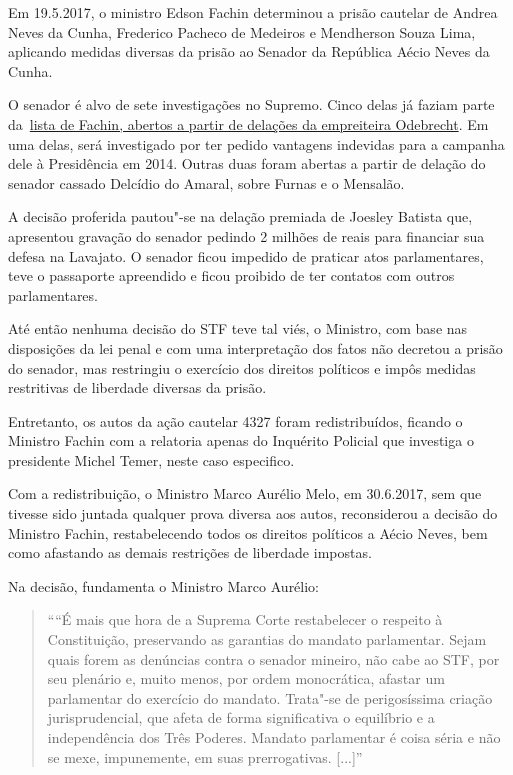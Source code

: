 {Em 19.5.2017, o ministro Edson Fachin determinou a prisão cautelar de
Andrea Neves da Cunha, Frederico Pacheco de Medeiros e Mendherson Souza
Lima, aplicando medidas diversas da prisão ao Senador da República Aécio
Neves da Cunha.

O senador é alvo de sete investigações no Supremo. Cinco delas já faziam
parte
da~\href{http://especiais.g1.globo.com/politica/operacao-lava-jato/2017/a-lista-de-fachin/}{{lista
de Fachin, abertos a partir de delações da empreiteira Odebrecht}}. Em
uma delas, será investigado por ter pedido vantagens indevidas para a
campanha dele à Presidência em 2014. Outras duas foram abertas a partir
de delação do senador cassado Delcídio do Amaral, sobre Furnas e o
Mensalão.

A decisão proferida pautou"-se na delação premiada de Joesley Batista
que, apresentou gravação do senador pedindo 2 milhões de reais para
financiar sua defesa na Lavajato. O senador ficou impedido de praticar
atos parlamentares, teve o passaporte apreendido e ficou proibido de ter
contatos com outros parlamentares.

Até então nenhuma decisão do STF teve tal viés, o Ministro, com base nas
disposições da lei penal e com uma interpretação dos fatos não decretou
a prisão do senador, mas restringiu o exercício dos direitos políticos e
impôs medidas restritivas de liberdade diversas da prisão.

Entretanto, os autos da ação cautelar 4327 foram redistribuídos, ficando
o Ministro Fachin com a relatoria apenas do Inquérito Policial que
investiga o presidente Michel Temer, neste caso especifico.

Com a redistribuição, o Ministro Marco Aurélio Melo, em 30.6.2017, sem
que tivesse sido juntada qualquer prova diversa aos autos, reconsiderou
a decisão do Ministro Fachin, restabelecendo todos os direitos políticos
a Aécio Neves, bem como afastando as demais restrições de liberdade
impostas.

Na decisão, fundamenta o Ministro Marco Aurélio:

\begin{quote}
````É mais que hora de a Suprema Corte restabelecer o respeito à
Constituição, preservando as garantias do mandato parlamentar. Sejam
quais forem as denúncias contra o senador mineiro, não cabe ao STF, por
seu plenário e, muito menos, por ordem monocrática, afastar um
parlamentar do exercício do mandato. Trata"-se de perigosíssima criação
jurisprudencial, que afeta de forma significativa o equilíbrio e a
independência dos Três Poderes. Mandato parlamentar é coisa séria e não
se mexe, impunemente, em suas prerrogativas. {[}...{]}''
\end{quote}

}
